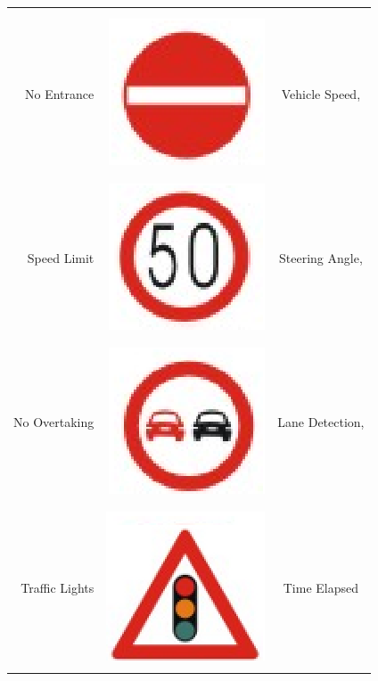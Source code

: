 \documentclass[a4paper,oneside,12pt]{report}
\begin{document}
\begin{table}[!ht]
{\begin{tabular}{|r|r|c|}
&&\\
\cline{1-2}
&&\\
{\scriptsize No Entrance} & \includegraphics[scale=0.3]{img/noenter} & {\scriptsize Vehicle Speed,}\\
&&\\
\cline{1-2}
&&\\
{\scriptsize Speed Limit} & \includegraphics[scale=0.3]{img/speedlimit} & {\scriptsize Steering Angle,} \\
&&\\
\cline{1-2}
&&\\
{\scriptsize No Overtaking} & \includegraphics[scale=0.3]{img/overtake} & {\scriptsize Lane Detection,}\\
&&\\
\cline{1-2}
&&\\
{\scriptsize Traffic Lights} & \includegraphics[scale=0.3]{img/trafficligt} & {\scriptsize Time Elapsed}\\
&&\\
\hline
\end{tabular}  
}
\label{viol}
\end{table}
\end{document}
